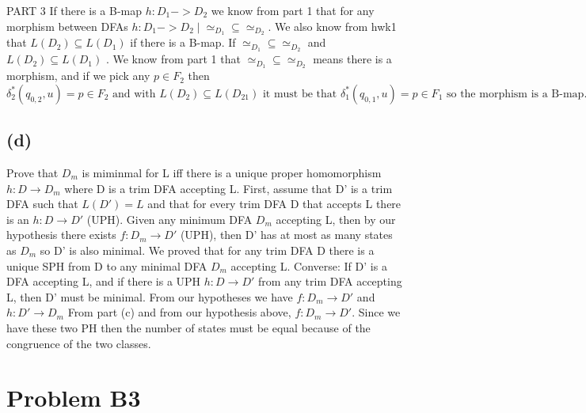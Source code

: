 \documentclass[12pt]{article}
\begin{document}
\medskip

PART 3\newline
If there is a B-map $h: D_1 -> D_2$ we know from part 1 that for any morphism between DFAs $h: D_1 -> D_2 \mid \simeq_{D_1} \subseteq \simeq_{D_2}$.  We also know from hwk1 that $L(D_2) \subseteq L(D_1)$ if there is a B-map.\newline
If $\simeq_{D_1} \subseteq \simeq_{D_2}$ and $L(D_2) \subseteq L(D_1)$ . We know from part 1 that $\simeq_{D_1} \subseteq \simeq_{D_2}$ means there is a morphism, and if we pick any $p \in F_2$ then $\delta^{*}_2(q_{0,2}, u) = p \in F_2 \text{ and with } L(D_2) \subseteq L(D_21) \text{ it must be that } \delta^{*}_1(q_{0,1}, u) = p \in F_1 \text{ so the morphism is a B-map. }$\newline

\subsection*{(d)}
Prove that $D_m$ is miminmal for L iff there is a unique proper homomorphism
$h:D \rightarrow D_m$ where D is a trim DFA accepting L.\newline
		First, assume that D' is a trim DFA such that $L(D') = L$ and
		that for every trim DFA D that accepts L there is an $h: D \rightarrow D'$ (UPH).
		Given any minimum DFA $D_m$ accepting L, then by our hypothesis there
		exists $f:D_m \rightarrow D'$ (UPH), then D' has at most as many states 
                as $D_m$ so D' is also minimal.
	We proved that for any trim DFA D there is a unique SPH from D to any
	minimal DFA $D_m$ accepting L. \newline
Converse: If D' is a DFA accepting L, and  if there is a UPH $h: D \rightarrow D'$ from any trim
DFA accepting L, then D' must be minimal.
	From our hypotheses we have $f: D_m \rightarrow D'$ and $h: D' \rightarrow D_m$
	From part (c) and from our hypothesis above, $f:D_m \rightarrow D'$.
	Since we have these two PH then the number of states must be equal because
	of the congruence of the two classes.

\section*{Problem B3}
\end{document}
